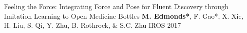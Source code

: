 


\begin{cvpublications}
\item \cvpublication
{Feeling the Force: Integrating Force and Pose for Fluent Discovery through Imitation Learning to Open Medicine Bottles} %
{\textbf{M. Edmonds*}, F. Gao*, X. Xie, H. Liu, S. Qi, Y. Zhu, B. Rothrock, \& S.C. Zhu} %
{IROS 2017} %
{}


\end{cvpublications}